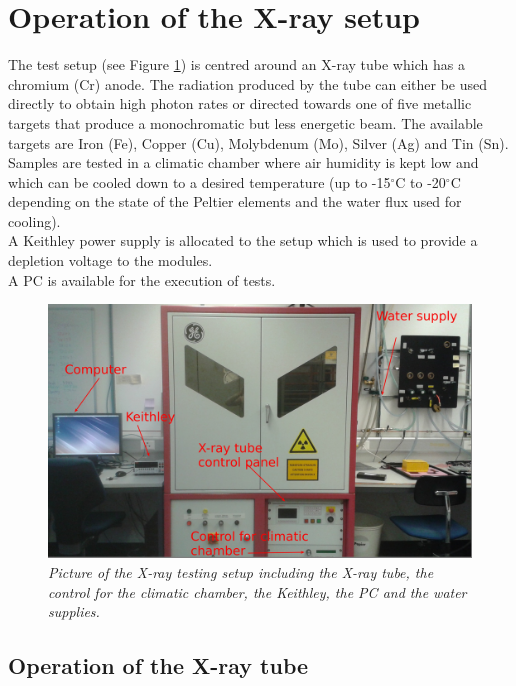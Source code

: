 \documentclass[a4paper,12pt,twoside]{article}
\begin{document}
\section{Operation of the X-ray setup}  \label{Xraysetup}
The test setup (see Figure \ref{Setup}) is centred around an X-ray tube which has a chromium (Cr) anode. The radiation produced by the tube can either be used directly to obtain high photon rates or directed towards one of five metallic targets that produce a monochromatic but less energetic beam. The available targets are Iron (Fe), Copper (Cu), Molybdenum (Mo), Silver (Ag) and Tin (Sn). \\
Samples are tested in a climatic chamber where air humidity is kept low and which can be cooled down to a desired temperature (up to -15$^\circ$C to -20$^\circ$C depending on the state of the Peltier elements and the water flux used for cooling). \\
A Keithley power supply is allocated to the setup which is used to provide a depletion voltage to the modules. \\
A PC is available for the execution of tests.

\begin{figure} [h!] \centering
\includegraphics[width=\textwidth, angle=0] {./Figures/Setup.jpg}
\caption{\em  \label{Setup}
Picture of the X-ray testing setup including the X-ray tube, the control for the climatic chamber, the Keithley, the PC and the water supplies.}
\end{figure}


\subsection{Operation of the X-ray tube} \label{Operation}
\end{document}
